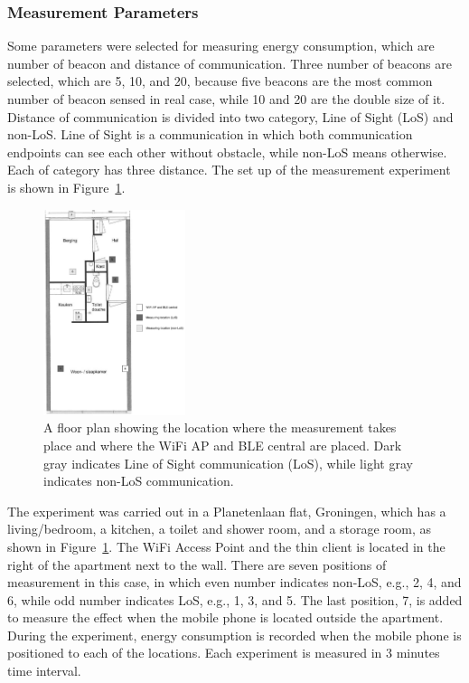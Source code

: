 \documentclass[journal]{vgtc}                %
\begin{document}
\subsubsection{Measurement Parameters} %
\label{ssub:measurement_parameters}
Some parameters were selected for measuring energy consumption, which are number of beacon and distance of communication. Three number of beacons are selected, which are 5, 10, and 20, because five beacons are the most common number of beacon sensed in real case, while 10 and 20 are the double size of it. Distance of communication is divided into two category, Line of Sight (LoS) and non-LoS. Line of Sight is a communication in which both communication endpoints can see each other without obstacle, while non-LoS means otherwise. Each of category has three distance. The set up of the measurement experiment is shown in Figure~\ref{fig:experiment-map}.

\begin{figure}
  \centering
    \includegraphics[width=0.37\textwidth]{experiment-map}
  \caption{A floor plan showing the location where the measurement takes place  and where the WiFi AP and BLE central are placed. Dark gray indicates Line of Sight communication (LoS), while light gray indicates non-LoS communication.}
  \label{fig:experiment-map}
\end{figure}

The experiment was carried out in a Planetenlaan flat, Groningen, which has a living/bedroom, a kitchen, a toilet and shower room, and a storage room, as shown in Figure~\ref{fig:experiment-map}. The WiFi Access Point and the thin client is located in the right of the apartment next to the wall. There are seven positions of measurement in this case, in which even number indicates non-LoS, e.g., 2, 4, and 6, while odd number indicates LoS, e.g., 1, 3, and 5. The last position, 7, is added to measure the effect when the mobile phone is located outside the apartment. During the experiment, energy consumption is recorded when the mobile phone is positioned to each of the locations. Each experiment is measured in 3 minutes time interval.
\end{document}
